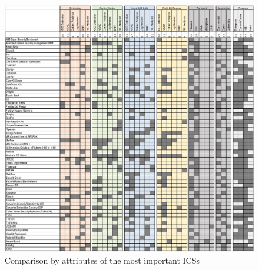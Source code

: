 \begin{figure}[H]
  \centering
	\includegraphics[width=\textwidth]{figuras/comparison_ics.png}
	\caption{Comparison by attributes of the most important ICSs\cite{comparison_ics}}
\end{figure}

